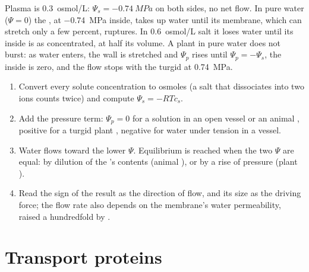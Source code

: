 \begin{example}\label{ex:b1:membranes-transport:redcell}
Plasma is \qty{0.3}{osmol/L}: $\Psi_s = \qty{-0.74}{MPa}$ on both sides,
no net flow. In pure water ($\Psi = 0$) the , at
\qty{-0.74}{MPa} inside, takes up water until its membrane, which can
stretch only a few percent, ruptures. In \qty{0.6}{osmol/L} salt it
loses water until its inside is as concentrated, at half its volume. A
plant  in pure water does not burst: as water enters, the wall is
stretched and $\Psi_p$ rises until $\Psi_p = -\Psi_s$, the  inside is zero, and the flow stops with the  turgid at
\qty{0.74}{MPa}.
\end{example}

\begin{method}\label{met:b1:membranes-transport:psi}
\begin{enumerate}
  \item Convert every solute concentration to osmoles (a salt that
        dissociates into two ions counts twice) and compute $\Psi_s =
        -RTc_s$.
  \item Add the pressure term: $\Psi_p = 0$ for a solution in an open
        vessel or an animal , positive for a turgid plant ,
        negative for water under tension in a  vessel.
  \item Water flows toward the lower $\Psi$. Equilibrium is reached
        when the two $\Psi$ are equal: by dilution of the 's
        contents (animal ), or by a rise of pressure (plant ).
  \item Read the sign of the result as the direction of flow, and its
        size as the driving force; the flow rate also depends on the
        membrane's water permeability, raised a hundredfold by
         .
\end{enumerate}
\end{method}

\section{Transport proteins}

